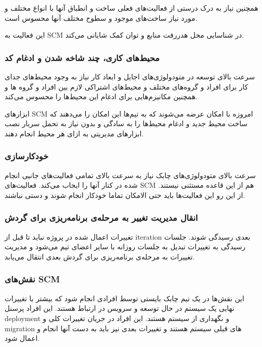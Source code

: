 همچنین نیاز به درک درستی از فعالیت‌های فعلی ساخت و انطباق آنها با انواع مختلف و مورد نیاز ساخت‌های موجود و سطوح مختلف آنها محسوس است.

این فعالیت به SCM در شناسایی محل هدررفت منابع و توان کمک شایانی می‌کند.

\subsubsection{محیط‌های کاری، چند شاخه شدن و ادغام کد}
سرعت بالای توسعه در متودولوژی‌های اجایل و ابعاد کار نیاز به وجود محیط‌های جدای کار برای افراد  و گروه‌های مختلف و محیط‌های اشتراکی لازم بین افراد و گروه ها و همچنین مکانیزم‌هایی برای ادغام این محیط‌ها را محسوس می‌کند.

ابزار‌های SCM امروزه با امکان
عرضه می‌شوند که به تیم‌ها این امکان را می‌دهند که ساخت محیط جدید و ادغام محیط‌ها را به سادگی و بدون نیاز به تحمل سربار نصب ابزار‌های مدیریتی به ازای هر محیط انجام دهند.

\subsubsection{خودکار‌سازی}
سرعت بالای متودولوژی‌های چابک نیاز به سرعت بالای تمامی فعالیت‌های جانبی انجام شده در کنار آنها را ایجاب می‌کند.
فعالیت‌های SCM هم از این قاعده مستثنی نیستند. از این رو این فعالیت‌ها باید حتی الامکان تماما خودکار انجام شوند و دستی نباشند.


\subsubsection{انقال مدیریت تغییر به مرحله‌ی برنامه‌ریزی برای گردش}
تغییرات اعمال شده در پروژه نباید تا قبل از iteration بعدی رسیدگی شوند. 
جلسات رسیدگی به تغییرات تبدیل به جلسات روزانه با سایر اعضای تیم می‌شود و مدیریت تغییرات به مرحله‌ی  برنامه‌ریزی برای گردش بعدی انتقال می‌یابد.

\subsubsection{نقش‌های SCM}
این نقش‌ها در یک تیم چابک بایستی توسط افرادی انجام شود که بیشتر با تغییرات نهایی یک سیستم در حال توسعه و سرویس در ارتباط هستند. این افراد پرسنل deployment و نگهداری از سیستم هستند. این افراد در جریان تغییرات کلی و migration های قبلی سیستم هستند و تغییرات بعدی نیز باید به دست آنها انجام و اعمال شود.

